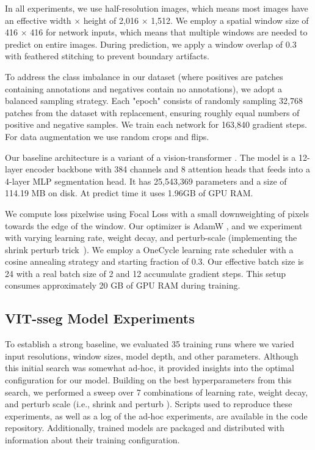 In all experiments, we use half-resolution images, which means most images have an effective width $\times$
  height of 2,016 $\times$ 1,512.
We employ a spatial window size of 416 $\times$ 416 for network inputs, which means that multiple windows
  are needed to predict on entire images.
During prediction, we apply a window overlap of 0.3 with feathered stitching to prevent boundary artifacts.

To address the class imbalance in our dataset (where positives are patches containing annotations and
  negatives contain no annotations), we adopt a balanced sampling strategy.
Each "epoch" consists of randomly sampling 32,768 patches from the dataset with replacement, ensuring
  roughly equal numbers of positive and negative samples.
We train each network for 163,840 gradient steps.
For data augmentation we use random crops and flips.

Our baseline architecture is a variant \cite{bertasius2021space,Greenwell_2024_WACV} of a vision-transformer
  \cite{dosovitskiy_image_2021}.
The model is a 12-layer encoder backbone with 384 channels and 8 attention heads that feeds into a 4-layer
  MLP segmentation head.
It has 25,543,369 parameters and a size of 114.19 MB on disk.
At predict time it uses 1.96GB of GPU RAM.

We compute loss pixelwise using Focal Loss \cite{ross2017focal} with a small downweighting of pixels towards
  the edge of the window.
Our optimizer is AdamW \cite{loshchilov_decoupled_2018}, and we experiment with varying learning rate,
  weight decay, and perturb-scale (implementing the shrink perturb trick~\cite{ash_warm_starting_2020,dohare_loss_2023}).
We employ a OneCycle learning rate scheduler \cite{smith2019super} with a cosine annealing strategy and
  starting fraction of 0.3.
Our effective batch size is 24 with a real batch size of 2 and 12 accumulate gradient steps.
This setup consumes approximately 20 GB of GPU RAM during training.

\subsection{VIT-sseg Model Experiments}

To establish a strong baseline, we evaluated 35 training runs where we varied input resolutions, window
  sizes, model depth, and other parameters.
Although this initial search was somewhat ad-hoc, it provided insights into the optimal configuration for
  our model.
Building on the best hyperparameters from this search, we performed a sweep over 7 combinations of learning
  rate, weight decay, and perturb scale (i.e., shrink and perturb \cite{ash_warm_starting_2020,dohare_loss_2023}).
Scripts used to reproduce these experiments, as well as a log of the ad-hoc experiments, are available in
  the code repository.
Additionally, trained models are packaged and distributed with information about their training
  configuration.


